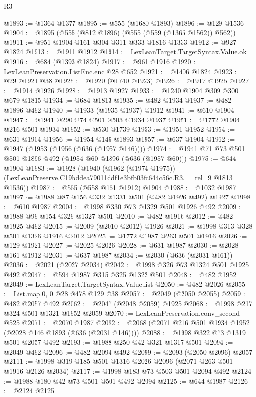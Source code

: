 \begin{lexlean}{R3}
\begin{coremodule}
@1893 := @1364 @1377
@1895 := @555 (@1680 @1893)
@1896 := @129 @1536
@1904 := @1895 (@555 (@812 @1896) (@555 (@559 (@1365 @1562)) @562))
@1911 := @951 @1904 @161 @304 @311 @333 @1816 @1333
@1912 := @927 @1824
@1913 := @1911 @1912
@1914 := LexLeanTarget.TargetSyntax.Value.ok
@1916 := @684 (@1393 @1824)
@1917 := @961 @1916
@1920 := LexLeanPreservation.ListEnc.enc @28 @652
@1921 := @1406 @1824
@1923 := @29 @1921 @38
@1925 := @1920 (@1740 @1923)
@1926 := @1917 @1925
@1927 := @1914 @1926
@1928 := @1913 @1927
@1933 := @1240 @1904 @309 @300 @679 @1815
@1934 := @684 @1813
@1935 := @482 @1934
@1937 := @482 @1896 @492
@1940 := @1933 (@1935 @1937) @1912
@1941 := @610 @1904
@1947 := @1941 @290 @74 @501 @503 @1934 @1937
@1951 := @1772 @1904 @216 @501 @1934
@1952 := @530 @1739
@1953 := @1951 @1952
@1954 := @631 @1904
@1956 := @1954 @146 @1893
@1957 := @637 @1904
@1962 := @1947 (@1953 (@1956 (@636 (@1957 @146))))
@1974 := @1941 @71 @73 @501 @501 @1896 @492 (@1954 @60 @1896 (@636 (@1957 @60)))
@1975 := @644 @1904
@1983 := @1928
    (@1940
      (@1962 (@1974 @1975))
      (LexLeanPreserve.C19bddea79011ddf1e3bfb03fc644c56c.R3.__rel_9 @1813 @1536))
@1987 := @555 (@558 @161 @1912) @1904
@1988 := @1032 @1987
@1997 := @1988 @87 @156 @332 @1331 @501 (@482 @1926 @492) @1927
@1998 := @610 @1987
@2004 := @1998 @330 @73 @1329 @501 @1926 @492
@2009 := @1988 @99 @154 @329 @1327 @501
@2010 := @482 @1916
@2012 := @482 @1925 @492
@2015 := @2009 (@2010 @2012) @1926
@2021 := @1998 @313 @328 @501 @1326 @1916 @2012
@2025 := @1772 @1987 @263 @501 @1916
@2026 := @129 @1921
@2027 := @2025 @2026
@2028 := @631 @1987
@2030 := @2028 @161 @1912
@2031 := @637 @1987
@2034 := @2030 (@636 (@2031 @161))
@2036 := @2021 (@2027 @2034)
@2042 := @1998 @326 @73 @1324 @501 @1925 @492
@2047 := @594 @1987 @315 @325 @1322 @501
@2048 := @482 @1952
@2049 := LexLeanTarget.TargetSyntax.Value.list
@2050 := @482 @2026
@2055 := List.map.{0, 0} @28 @478 @129 @38
@2057 := @2049 (@2050 @2055)
@2059 := @482 @2057 @492
@2062 := @2047 (@2048 @2059) @1925
@2068 := @1998 @217 @324 @501 @1321 @1952 @2059
@2070 := LexLeanPreservation.conv_second @525
@2071 := @2070 @1987
@2082 := @2068 (@2071 @216 @501 @1934 @1952 (@2028 @146 @1893 (@636 (@2031 @146))))
@2088 := @1998 @322 @73 @1319 @501 @2057 @492
@2093 := @1988 @250 @42 @321 @1317 @501
@2094 := @2049 @492
@2096 := @482 @2094 @492
@2099 := @2093 (@2050 @2096) @2057
@2111 := @1998 @319 @185 @501 @1316 @2026 @2096 (@2071 @263 @501 @1916 @2026 @2034)
@2117 := @1998 @183 @73 @503 @501 @2094 @492
@2124 := @1988 @180 @42 @73 @501 @501 @492 @2094
@2125 := @644 @1987
@2126 := @2124 @2125

\end{coremodule}
\end{lexlean}
